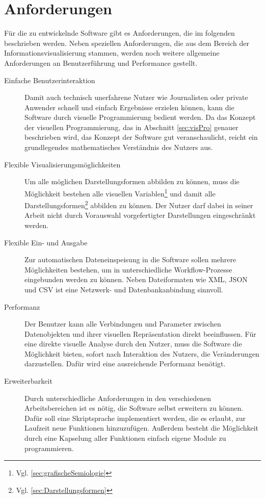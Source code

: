 \documentclass[a4paper, 12pt, DIVcalc, onepage, pdftex, headsepline, footsepline]{scrreprt}
\begin{document}
\section{Anforderungen}
\label{sec:Anforderungen}
Für die zu entwickelnde Software gibt es Anforderungen, die
im folgenden beschrieben werden. Neben speziellen Anforderungen, die aus
dem Bereich der Informationsvisualisierung stammen, werden noch weitere
allgemeine Anforderungen an Benutzerführung und Performance gestellt.
\begin{description}
\item[Einfache Benutzerinteraktion]
Damit auch technisch unerfahrene Nutzer wie Journalisten oder private
Anwender schnell und einfach Ergebnisse erzielen können, kann die Software
durch visuelle Programmierung bedient werden. Da das Konzept der visuellen
Programmierung, das in Abschnitt \ref{sec:visPro} genauer beschrieben wird,
das Konzept der Software gut veranschaulicht, reicht ein grundlegendes
mathematisches Verständnis des Nutzers aus.
\item[Flexible Visualisierungsmöglichkeiten]
Um alle möglichen Darstellungsformen abbilden zu können, muss die 
Möglichkeit bestehen alle visuellen Variablen\footnote{Vgl.
\ref{sec:grafischeSemiologie}} und damit alle Darstellungsformen\footnote{Vgl.
\ref{sec:Darstellungsformen}} abbilden zu können. Der Nutzer darf dabei
in seiner Arbeit nicht durch Vorauswahl vorgefertigter Darstellungen
eingeschränkt werden.
\item[Flexible Ein- und Ausgabe]
Zur automatischen Dateneinspeisung in die Software sollen mehrere Möglichkeiten
bestehen, um in unterschiedliche Workflow-Prozesse eingebunden werden zu können.
Neben Dateiformaten wie XML, JSON und CSV ist eine Netzwerk- und
Datenbankanbindung sinnvoll.
\item[Performanz]
Der Benutzer kann alle Verbindungen und Parameter zwischen Datenobjekten und ihrer
visuellen Repräsentation direkt beeinflussen. Für eine direkte visuelle Analyse
durch den Nutzer, muss die Software die Möglichkeit bieten, sofort
nach Interaktion des Nutzers, die Veränderungen darzustellen. Dafür wird eine
ausreichende Performanz benötigt.
\item[Erweiterbarkeit]
Durch unterschiedliche Anforderungen in den verschiedenen Arbeitsbereichen ist
es nötig, die Software selbst erweitern zu können. Dafür soll eine Skriptsprache
implementiert werden, die es erlaubt, zur Laufzeit neue Funktionen hinzuzufügen.
Außerdem besteht die Möglichkeit durch eine Kapselung aller Funktionen
einfach eigene Module zu programmieren.

\end{description}
\end{document}
